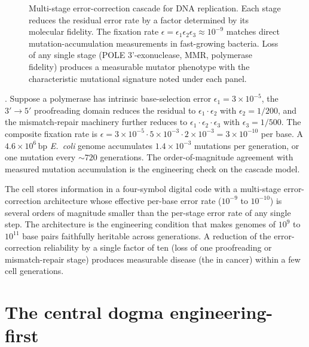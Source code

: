 \begin{figure}[h]
\centering

\caption{Multi-stage error-correction cascade for DNA replication.
Each stage reduces the residual error rate by a factor determined
by its molecular fidelity. The fixation rate
$\epsilon = \epsilon_1 \epsilon_2 \epsilon_3 \approx 10^{-9}$ matches
direct mutation-accumulation measurements in fast-growing bacteria.
Loss of any single stage (POLE 3'-exonuclease, MMR, polymerase
fidelity) produces a measurable mutator phenotype with the
characteristic mutational signature noted under each panel.}
\label{fig:error-cascade}
\end{figure}

. Suppose a polymerase
has intrinsic base-selection error $\epsilon_1 = 3 \times 10^{-5}$,
the $3' \to 5'$ proofreading domain reduces the residual to
$\epsilon_1 \cdot \epsilon_2$ with $\epsilon_2 = 1/200$, and the
mismatch-repair machinery further reduces to
$\epsilon_1 \cdot \epsilon_2 \cdot \epsilon_3$ with
$\epsilon_3 = 1/500$. The composite fixation rate is
$\epsilon = 3 \times 10^{-5} \cdot 5 \times 10^{-3} \cdot 2 \times 10^{-3}
= 3 \times 10^{-10}$ per base. A $4.6 \times 10^6\,\text{bp}$
\emph{E.~coli} genome accumulates $1.4 \times 10^{-3}$ mutations per
generation, or one mutation every $\sim 720$ generations. The
order-of-magnitude agreement with measured mutation accumulation
\cite{paper:v6c03-lee-2012} is the engineering check on the cascade
model.

\begin{principle}
The cell stores information in a four-symbol digital code with a
multi-stage error-correction architecture whose effective per-base
error rate ($10^{-9}$ to $10^{-10}$) is several orders of magnitude
smaller than the per-stage error rate of any single step. The
architecture is the engineering condition that makes genomes of
$10^9$ to $10^{11}$ base pairs faithfully heritable across
generations. A reduction of the error-correction reliability by a
single factor of ten (loss of one proofreading or mismatch-repair
stage) produces measurable disease (the 
in cancer) within a few cell generations.
\end{principle}

\section{The central dogma engineering-first}

